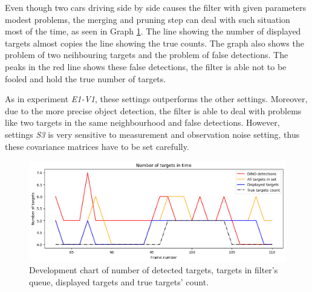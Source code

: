 Even though two cars driving side by side causes the filter with given parameters modest problems, the merging and pruning step can deal with such situation most of the time, as seen in Graph \ref{gr:E1-V2-S3}. The line showing the number of displayed targets almost copies the line showing the true counts. The graph also shows the problem of two neihbouring targets and the problem of false detections. The peaks in the red line shows these false detections, the filter is able not to be fooled and hold the true number of targets.


As in experiment \textit{E1-V1}, these settings outperforms the other settings. Moreover, due to the more precise object detection, the filter is able to deal with problems like two targets in the same neighbourhood and false detections. However, settings \textit{S3} is very sensitive to measurement and observation noise setting, thus these covariance matrices have to be set carefully.

\begin{figure}[H]
    \centering
    \includegraphics[width=\linewidth]{../../../experiments/E1/V2/DINO/dino_det}
    \caption{Development chart of number of detected targets, targets in filter's queue, displayed targets and true targets' count.}
    \label{gr:E1-V2-S3}
\end{figure}

